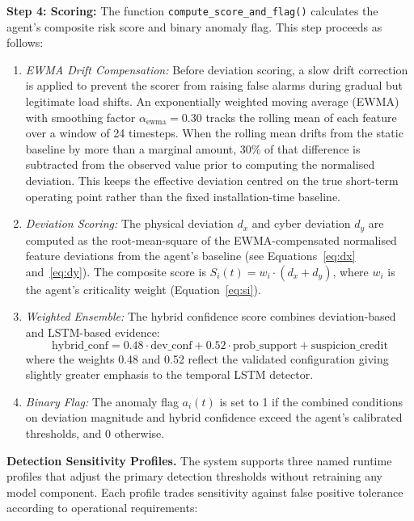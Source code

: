 \par \vspace{0.35cm}
\noindent
\textbf{Step 4: Scoring:} The function \texttt{compute\_score\_and\_flag()} calculates the agent's composite risk score and binary anomaly flag. This step proceeds as follows:
\begin{enumerate}
    \item \textit{EWMA Drift Compensation:} Before deviation scoring, a slow drift correction is applied to prevent the scorer from raising false alarms during gradual but legitimate load shifts. An exponentially weighted moving average (EWMA) with smoothing factor $\alpha_{\text{ewma}} = 0.30$ tracks the rolling mean of each feature over a window of 24 timesteps. When the rolling mean drifts from the static baseline by more than a marginal amount, 30\% of that difference is subtracted from the observed value prior to computing the normalised deviation. This keeps the effective deviation centred on the true short-term operating point rather than the fixed installation-time baseline.
    \item \textit{Deviation Scoring:} The physical deviation $d_x$ and cyber deviation $d_y$ are computed as the root-mean-square of the EWMA-compensated normalised feature deviations from the agent's baseline (see Equations~\ref{eq:dx} and~\ref{eq:dy}). The composite score is $S_i(t) = w_i \cdot (d_x + d_y)$, where $w_i$ is the agent's criticality weight (Equation~\ref{eq:si}).
    \item \textit{Weighted Ensemble:} The hybrid confidence score combines deviation-based and LSTM-based evidence:
    \begin{equation}
    \text{hybrid\_conf} = 0.48 \cdot \text{dev\_conf} + 0.52 \cdot \text{prob\_support} + \text{suspicion\_credit}
    \label{eq:hybrid_inline}
    \end{equation}
    where the weights 0.48 and 0.52 reflect the validated configuration giving slightly greater emphasis to the temporal LSTM detector.
    \item \textit{Binary Flag:} The anomaly flag $a_i(t)$ is set to 1 if the combined conditions on deviation magnitude and hybrid confidence exceed the agent's calibrated thresholds, and 0 otherwise.
\end{enumerate}

\par \vspace{0.35cm}
\noindent
\textbf{Detection Sensitivity Profiles.} The system supports three named runtime profiles that adjust the primary detection thresholds without retraining any model component. Each profile trades sensitivity against false positive tolerance according to operational requirements:

